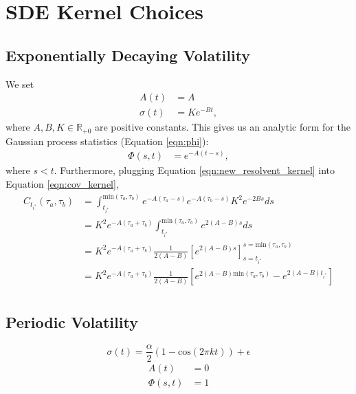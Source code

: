 \section{SDE Kernel Choices}\label{sec:sde_kernel_choices}

\subsection{Exponentially Decaying Volatility}\label{subsec:exponential_decay_volatility}

We set
\begin{align}
    A(t) &= A \\
    \sigma(t) &= Ke^{-Bt},
\end{align}
where $A, B, K \in \mathbb{R}_{+0}$ are positive constants. This gives us an analytic form for the Gaussian process statistics (Equation \ref{eqn:phi}):
\begin{align}
    \Phi(s, t) &= e^{-A(t-s)},\label{eqn:new_resolvent_kernel}
\end{align}
where $s < t$. Furthermore, plugging Equation \ref{eqn:new_resolvent_kernel} into Equation \ref{eqn:cov_kernel},
\begin{align}
    C_{t_{i^*}}(\tau_a, \tau_b) &= \int_{t_{i^*}}^{\text{min}(\tau_a, \tau_b)} e^{-A(\tau_a - s)}e^{-A(\tau_b - s)}K^2 e^{-2Bs} ds \\
    &= K^2 e^{-A(\tau_a + \tau_b)} \int_{t_{i^*}}^{\text{min}(\tau_a, \tau_b)} e^{2(A-B)s}ds \\
    &= K^2 e^{-A(\tau_a + \tau_b)} \frac{1}{2(A-B)}\left[e^{2(A-B)s}\right]_{s=t_{i^*}}^{s=\text{min}(\tau_a, \tau_b)} \\
    &= K^2 e^{-A(\tau_a + \tau_b)} \frac{1}{2(A-B)}\left[e^{2(A-B)\text{min}(\tau_a, \tau_b)} - e^{2(A-B)t_{i^*}}\right] \\
\end{align}

\subsection{Periodic Volatility}\label{subsec:periodic_volatility_kernel}
\begin{equation}
    \sigma(t) = \frac{\alpha}{2}\left(1 - \text{cos}\left(2\pi kt\right)\right) + \epsilon
\end{equation}
\begin{align}
    A(t) &= 0 \\
    \Phi(s, t) &= 1
\end{align}

